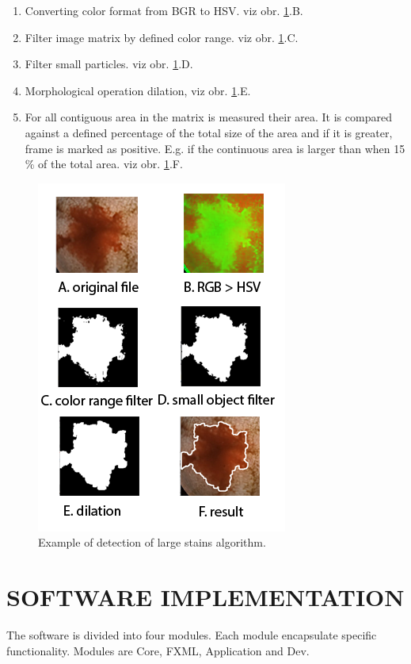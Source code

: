 \documentclass[twoside]{article}
\begin{document}
\begin{multicols}{2}
\begin{enumerate}
	\item Converting color format from BGR to HSV. viz obr. \ref{fig:alg_2}.B.
	\item Filter image matrix by defined color range. viz obr. \ref{fig:alg_2}.C.
	\item Filter small particles. viz obr. \ref{fig:alg_2}.D.
	\item Morphological operation dilation, viz obr. \ref{fig:alg_2}.E.
	\item For all contiguous area in the matrix is measured their area. It is compared against a defined percentage of the total size of the area and if it is greater, frame is marked as positive. E.g. if the continuous area is larger than when 15 \% of the total area. viz obr. \ref{fig:alg_2}.F.
\end{enumerate} 

\begin{figure}[H]
	\includegraphics[scale=0.5]{alg2_clanek}
	\centering
	\caption{Example of detection of large stains algorithm. \label{fig:alg_2}}
\end{figure} 

\section{SOFTWARE IMPLEMENTATION}
The software is divided into four modules. Each module encapsulate specific functionality. Modules are Core, FXML, Application and Dev.


\end{multicols}
\end{document}
